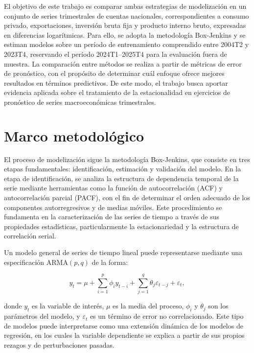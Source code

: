 \documentclass[12pt,a4paper]{article}
\begin{document}
	El objetivo de este trabajo es comparar ambas estrategias de modelización en un conjunto de series trimestrales de cuentas nacionales, correspondientes a consumo privado, exportaciones, inversión bruta fija y producto interno bruto, expresadas en diferencias logarítmicas. Para ello, se adopta la metodología Box-Jenkins y se estiman modelos sobre un período de entrenamiento comprendido entre 2004T2 y 2023T4, reservando el período 2024T1--2025T4 para la evaluación fuera de muestra. La comparación entre métodos se realiza a partir de métricas de error de pronóstico, con el propósito de determinar cuál enfoque ofrece mejores resultados en términos predictivos. De este modo, el trabajo busca aportar evidencia aplicada sobre el tratamiento de la estacionalidad en ejercicios de pronóstico de series macroeconómicas trimestrales.
	
	\section{Marco metodológico}
	
	El proceso de modelización sigue la metodología Box-Jenkins, que consiste en tres etapas fundamentales: identificación, estimación y validación del modelo. En la etapa de identificación, se analiza la estructura de dependencia temporal de la serie mediante herramientas como la función de autocorrelación (ACF) y autocorrelación parcial (PACF), con el fin de determinar el orden adecuado de los componentes autorregresivos y de medias móviles. Este procedimiento se fundamenta en la caracterización de las series de tiempo a través de sus propiedades estadísticas, particularmente la estacionariedad y la estructura de correlación serial.
	
	Un modelo general de series de tiempo lineal puede representarse mediante una especificación ARMA$(p,q)$ de la forma:
	
	\begin{equation}
		y_t = \mu + \sum_{i=1}^{p} \phi_i y_{t-i} + \sum_{j=1}^{q} \theta_j \varepsilon_{t-j} + \varepsilon_t,
	\end{equation}
	
	donde $y_t$ es la variable de interés, $\mu$ es la media del proceso, $\phi_i$ y $\theta_j$ son los parámetros del modelo, y $\varepsilon_t$ es un término de error no correlacionado. Este tipo de modelos puede interpretarse como una extensión dinámica de los modelos de regresión, en los cuales la variable dependiente se explica a partir de sus propios rezagos y de perturbaciones pasadas.
	
\end{document}
